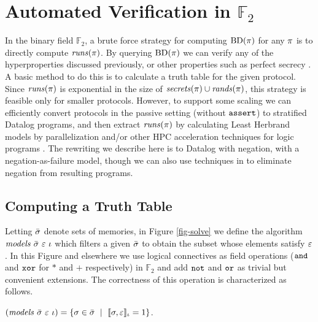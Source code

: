 \section{Automated Verification in $\mathbb{F}_2$}
\label{section-bruteforce}

In the binary field $\mathbb{F}_2$, a brute force strategy for computing
$\mathrm{BD}(\pi)$ for any $\pi$ is to directly compute
$\mathit{runs}(\pi)$. By querying $\mathrm{BD}(\pi)$ we can verify any of the
hyperproperties discussed previously, or other properties such as
perfect secrecy \cite{barthe2019probabilistic}.  A basic method to do this is
to calculate a truth table for the given protocol. Since
$\mathit{runs}(\pi)$ is exponential in
the size of $\mathit{secrets}(\pi) \cup \mathit{rands}(\pi)$, this strategy is
feasible only for smaller protocols. However, to support some
scaling we can efficiently
convert protocols in the passive setting (without $\texttt{assert}$) to
stratified Datalog programs, and then extract $\mathit{runs}(\pi)$ by
calculating Least Herbrand models by parallelization and/or other HPC
acceleration techniques for logic programs \cite{aspis2018linear}.
The rewriting we describe here is to Datalog with negation, with a
negation-as-failure model, though we can also use techniques in
\cite{sakama2017linear} to eliminate negation from resulting programs.

\subsection{Computing a Truth Table}

Letting $\bar{\sigma}$ denote sets of memories, in Figure \ref{fig-solve}
we define the algorithm $\mathit{models}\ \bar{\sigma}\ \varepsilon\ \iota$ which filters a
given $\bar{\sigma}$ to obtain the subset whose elements satisfy $\varepsilon$. In
this Figure and elsewhere we use logical connectives as field
operations ($\texttt{and}$ and $\texttt{xor}$ for $*$ and $+$ respectively) in
$\mathbb{F}_2$ and add $\texttt{not}$ and $\texttt{or}$ as trivial but convenient
extensions. The correctness of this operation is characterized as
follows.
\begin{lemma}
  \label{lemma-solves}
  $(\mathit{models}\ \bar{\sigma}\ \varepsilon\ \iota) = \{ \sigma \in \bar{\sigma} \ \mid\ \llbracket \sigma,\varepsilon \rrbracket_{\iota} = 1 \}$.
\end{lemma}

\solvefig

